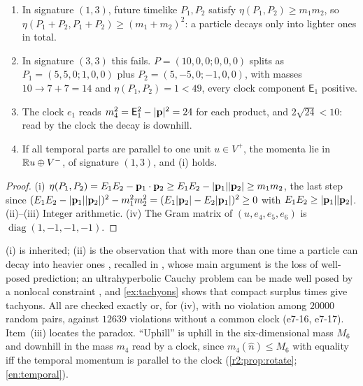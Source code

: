 \begin{proposition}
\label{e7:prop:uphill}
\begin{enumerate}[label=(\roman*),leftmargin=2.2em]
\item In signature $(1,3)$, future timelike $P_1,P_2$ satisfy $\eta(P_1,P_2)\ge m_1m_2$, so $\eta(P_1+P_2,P_1+P_2)\ge(m_1+m_2)^2$: a particle
decays only into lighter ones in total.
\item In signature $(3,3)$ this fails. $P=(10,0,0;0,0,0)$ splits as $P_1=(5,5,0;1,0,0)$ plus $P_2=(5,-5,0;-1,0,0)$, with masses
$10\to7+7=14$ and $\eta(P_1,P_2)=1<49$, every clock component $\mathsf E_1$ positive.
\item The clock $e_1$ reads $m_4^2=\mathsf E_1^2-|\mathbf p|^2=24$ for each product, and $2\sqrt{24}<10$: read by the clock the decay is downhill.
\item If all temporal parts are parallel to one unit $u\in V^+$, the momenta lie in $\mathbb{R} u\oplus V^-$, of signature $(1,3)$, and (i) holds.
\end{enumerate}
\end{proposition}

\begin{proof}
(i) $\eta(P_1,P_2)=E_1E_2-\mathbf p_1\cdot\mathbf p_2\ge E_1E_2-|\mathbf p_1||\mathbf p_2|\ge m_1m_2$, the last step since
$(E_1E_2-|\mathbf p_1||\mathbf p_2|)^2-m_1^2m_2^2=(E_1|\mathbf p_2|-E_2|\mathbf p_1|)^2\ge0$ with $E_1E_2\ge|\mathbf p_1||\mathbf p_2|$. (ii)--(iii) Integer arithmetic. (iv) The Gram
matrix of $(u,e_4,e_5,e_6)$ is $\operatorname{diag}(1,-1,-1,-1)$.
\end{proof}

(i) is inherited; (ii) is the observation that with more than one time a particle can decay into heavier ones \cite{Dorling70}, recalled in
\cite{Tegmark97}, whose main argument is the loss of well-posed prediction; an ultrahyperbolic Cauchy problem can be made well posed by a nonlocal
constraint \cite{CraigWeinstein09}, and \cref{ex:tachyons} shows that compact surplus times give tachyons. All are checked exactly or,
for (iv), with no violation among $20000$ random pairs, against $12639$ violations without a common clock (e7-16, e7-17). Item~(iii) locates the
paradox. ``Uphill'' is uphill in the six-dimensional mass $M_6$ and downhill in the mass $m_4$ read by a clock, since $m_4(\hat n)\le M_6$ with equality iff
the temporal momentum is parallel to the clock (\cref{r2:prop:rotate}; \cref{en:temporal}).

